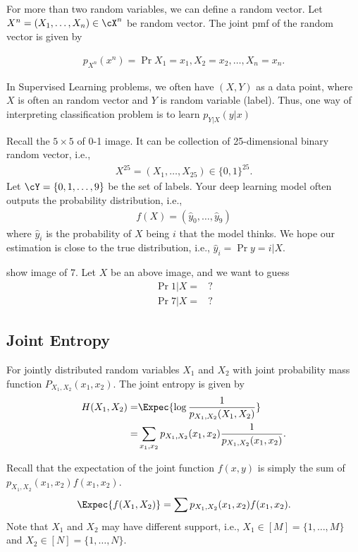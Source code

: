 \documentclass{article}
\begin{document}
For more than two random variables, we can define a random vector.
Let $X^n = (X_1, \dots, X_n)\in \cX^n$ be random vector.
The joint pmf of the random vector is given by

\begin{align}
    p_{X^n}(x^n) = \Pr{X_1=x_1,X_2=x_2,\dots, X_n=x_n}.
\end{align}

In Supervised Learning problems, we often have $(X, Y)$ as a data point,
where $X$ is often an random vector and $Y$ is random variable (label).
Thus, one way of interpreting classification problem is to learn $p_{Y|X}(y|x)$

\begin{example}
    Recall the $5\times 5$ of 0-1 image.
    It can be collection of 25-dimensional binary random vector, i.e.,
    \begin{align}
        X^{25} = (X_1, \dots, X_{25}) \in\{0, 1\}^{25}.
    \end{align}
    Let $\cY = \{0,1,\dots, 9\}$ be the set of labels.
    Your deep learning model often outputs the probability distribution, i.e.,
    \begin{align}
        f(X) = (\hat{y}_0, \dots, \hat{y}_9)
    \end{align}
    where $\hat{y}_i$ is the probability of $X$ being $i$ that the model thinks.
    We hope our estimation is close to the true distribution, i.e., $\hat{y}_i = \Pr{y=i|X}$.
    
    {\red show image of 7}.
    Let $X$ be an above image, and we want to guess
    \begin{align}
        \Pr{1|X} =& ? \\
        \Pr{7|X} =& ? 
    \end{align}
\end{example}

\subsection{Joint Entropy}
\begin{definition}
    For jointly distributed random variables $X_1$ and $X_2$ with joint probability mass function $P_{X_1, X_2}(x_1, x_2)$.
    The joint entropy is given by
    \begin{align}
        H(X_1, X_2) =& \Expec{\log \frac{1}{p_{X_1, X_2}(X_1, X_2)}}\\
        =& \sum_{x_1, x_2} p_{X_1, X_2} (x_1, x_2) \frac{1}{p_{X_1, X_2} (x_1, x_2)}.
    \end{align}
\end{definition}
Recall that the expectation of the joint function $f(x,y)$ is simply the sum of $p_{X_1, X_2}(x_1,x_2)f(x_1,x_2)$.
\begin{equation}
\Expec{f(X_1, X_2)}=\sum p_{X_1, X_2}(x_1,x_2)f(x_1,x_2).
\end{equation}
Note that $X_1$ and $X_2$ may have different support, i.e., $X_1\in[M] = \{1, \dots,M\}$ and $X_2 \in [N] = \{1, \dots, N\}$.
\end{document}
